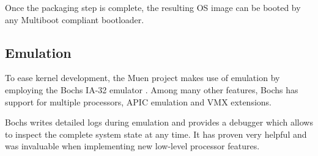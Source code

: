 Once the packaging step is complete, the resulting OS image can be booted by any
Multiboot \cite{multiboot} compliant bootloader.

\subsection{Emulation}\label{subsec:emulation}
To ease kernel development, the Muen project makes use of emulation by
employing the Bochs IA-32 emulator \cite{bochs}. Among many
other features, Bochs has support for multiple processors, APIC emulation and
VMX extensions.

Bochs writes detailed logs during emulation and provides a debugger which allows
to inspect the complete system state at any time. It has proven very helpful
and was invaluable when implementing new low-level processor features.
